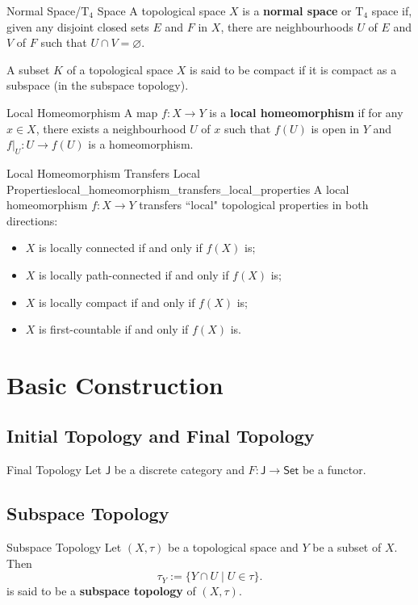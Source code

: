 \documentclass{report}
\begin{document}
\begin{definition}{Normal Space/$\mathrm{T}_4$ Space}{}
	A topological space $X$ is a \textbf{normal space} or $\mathrm{T}_4$ space if, given any disjoint closed sets $E$ and $F$ in $X$, there are neighbourhoods $U$ of $E$ and $V$ of $F$ such that $U\cap V=\varnothing$.
\end{definition}


A subset $K$ of a topological space $X$ is said to be compact if it is compact as a subspace (in the subspace topology).
\begin{definition}{Local Homeomorphism}{}
	A map $f:X\to Y$ is a \textbf{local homeomorphism} if for any $x\in X$, there exists a neighbourhood $U$ of $x$ such that $f(U)$ is open in $Y$ and $f|_U:U\to f(U)$ is a homeomorphism.
\end{definition}

\begin{proposition}{Local Homeomorphism Transfers Local Properties}{local_homeomorphism_transfers_local_properties}
	A local homeomorphism $f: X \rightarrow Y$ transfers ``local" topological properties in both directions:
	\begin{itemize}
		\item $X$ is locally connected if and only if $f(X)$ is;
		\item  $X$ is locally path-connected if and only if $f(X)$ is;
		\item  $X$ is locally compact if and only if $f(X)$ is;
		\item  $X$ is first-countable if and only if $f(X)$ is.
	\end{itemize}
\end{proposition}

\section{Basic Construction}
\subsection{Initial Topology and Final Topology}
\begin{definition}{Final Topology}{}
	Let $\mathsf{J}$ be a discrete category and $F:\mathsf{J}\to\mathsf{Set}$ be a functor. 
\end{definition}

\subsection{Subspace Topology}
\begin{definition}{Subspace Topology}{}
	Let $(X,\tau)$ be a topological space and $Y$ be a subset of $X$. Then
	\[
		\tau_Y:=\{Y\cap U\mid U\in \tau\}.
	\]
	is said to be a \textbf{subspace topology} of $(X,\tau)$.
\end{definition}
\end{document}

